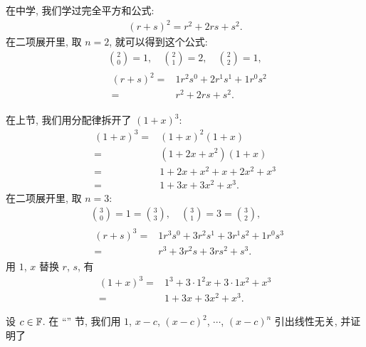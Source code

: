 \begin{example}
    在中学, 我们学过完全平方和公式:
    \begin{align*}
        (r + s)^2 = r^2 + 2rs + s^2.
    \end{align*}
    在二项展开里, 取 $n = 2$, 就可以得到这个公式:
    \begin{align*}
         & \binom{2}{0} = 1, \quad \binom{2}{1} = 2, \quad \binom{2}{2} = 1, \\
         & \begin{aligned}
            (r + s)^2
            = {} & 1r^2 s^0 + 2r^1 s^1 + 1r^0 s^2 \\
            = {} & r^2 + 2rs + s^2.
        \end{aligned}
    \end{align*}

    在上节, 我们用分配律拆开了 $(1+x)^3$:
    \begin{align*}
        (1+x)^3
        = {} & (1+x)^2 (1+x)         \\
        = {} & (1+2x+x^2) (1+x)      \\
        = {} & 1+2x+x^2 + x+2x^2+x^3 \\
        = {} & 1+3x+3x^2+x^3.
    \end{align*}
    在二项展开里, 取 $n = 3$:
    \begin{align*}
         & \binom{3}{0} = 1 = \binom{3}{3}, \quad \binom{3}{1} = 3 = \binom{3}{2}, \\
         & \begin{aligned}
            (r+s)^3
            = {} & 1r^3 s^0 + 3r^2 s^1 + 3r^1 s^2 + 1r^0 s^3 \\
            = {} & r^3 + 3r^2 s + 3r s^2 + s^3.
        \end{aligned}
    \end{align*}
    用 $1$, $x$ 替换 $r$, $s$, 有
    \begin{align*}
        (1+x)^3
        = {} & 1^3 + 3 \cdot 1^2 x + 3 \cdot 1 x^2 + x^3 \\
        = {} & 1 + 3x + 3x^2 + x^3.
    \end{align*}
\end{example}

设 $c \in \mathbb{F}$. 在 ``\PolynomialEquality '' 节, 我们用 $1$, $x-c$, $(x-c)^2$, $\cdots$, $(x-c)^n$ 引出线性无关, 并证明了

